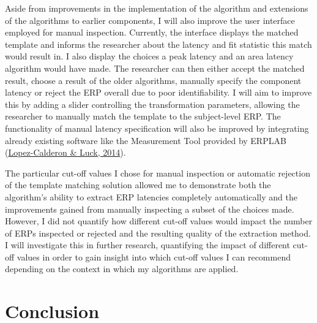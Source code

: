 \documentclass[
  man]{apa7}
\begin{document}
Aside from improvements in the implementation of the algorithm and extensions of the algorithms to earlier components, I will also improve the user interface employed for manual inspection. Currently, the interface displays the matched template and informs the researcher about the latency and fit statistic this match would result in. I also display the choices a peak latency and an area latency algorithm would have made. The researcher can then either accept the matched result, choose a result of the older algorithms, manually specify the component latency or reject the ERP overall due to poor identifiability. I will aim to improve this by adding a slider controlling the transformation parameters, allowing the researcher to manually match the template to the subject-level ERP. The functionality of manual latency specification will also be improved by integrating already existing software like the Measurement Tool provided by ERPLAB (\protect\hyperlink{ref-lopez2014erplab}{Lopez-Calderon \& Luck, 2014}).

The particular cut-off values I chose for manual inspection or automatic rejection of the template matching solution allowed me to demonstrate both the algorithm's ability to extract ERP latencies completely automatically and the improvements gained from manually inspecting a subset of the choices made. However, I did not quantify how different cut-off values would impact the number of ERPs inspected or rejected and the resulting quality of the extraction method. I will investigate this in further research, quantifying the impact of different cut-off values in order to gain insight into which cut-off values I can recommend depending on the context in which my algorithms are applied.

\hypertarget{conclusion}{%
\section{Conclusion}\label{conclusion}}
\end{document}
